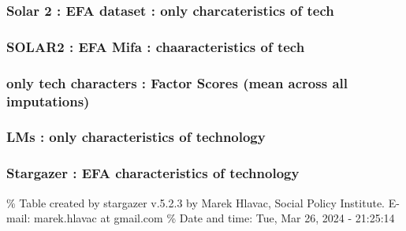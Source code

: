 \documentclass[
]{article}
\begin{document}
\hypertarget{solar-2-efa-dataset-only-charcateristics-of-tech}{%
\subsubsection{Solar 2 : EFA dataset : only charcateristics of
tech}\label{solar-2-efa-dataset-only-charcateristics-of-tech}}

\hypertarget{solar2-efa-mifa-chaaracteristics-of-tech}{%
\subsubsection{SOLAR2 : EFA Mifa : chaaracteristics of
tech}\label{solar2-efa-mifa-chaaracteristics-of-tech}}

\hypertarget{only-tech-characters-factor-scores-mean-across-all-imputations}{%
\subsubsection{only tech characters : Factor Scores (mean across all
imputations)}\label{only-tech-characters-factor-scores-mean-across-all-imputations}}

\hypertarget{lms-only-characteristics-of-technology}{%
\subsubsection{LMs : only characteristics of
technology}\label{lms-only-characteristics-of-technology}}

\newpage

\hypertarget{stargazer-efa-characteristics-of-technology}{%
\subsubsection{Stargazer : EFA characteristics of
technology}\label{stargazer-efa-characteristics-of-technology}}

\begingroup\setlength{\tabcolsep}{1pt}

\renewcommand{\arraystretch}{0.7}

\% Table created by stargazer v.5.2.3 by Marek Hlavac, Social Policy
Institute. E-mail: marek.hlavac at gmail.com \% Date and time: Tue, Mar
26, 2024 - 21:25:14
\end{document}
